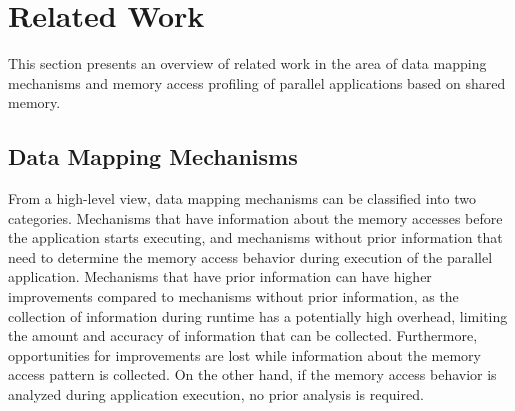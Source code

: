 
\section{Related Work}
\label{sec:soa}

This section presents an overview of related work in the area of data mapping mechanisms and memory access profiling of parallel applications based on shared memory.

\subsection{Data Mapping Mechanisms}
\label{sec:soa-mapping}

From a high-level view, data mapping mechanisms can be classified into two categories.
Mechanisms that have information about the memory accesses before the application starts executing, and mechanisms without prior information that need to determine the memory access behavior during execution of the parallel application.
Mechanisms that have prior information can have higher improvements compared to mechanisms without prior information, as the collection of information during runtime has a potentially high overhead, limiting the amount and accuracy of information that can be collected.
Furthermore, opportunities for improvements are lost while information about the memory access pattern is collected.
On the other hand, if the memory access behavior is analyzed during application execution, no prior analysis is required.
%
%    

